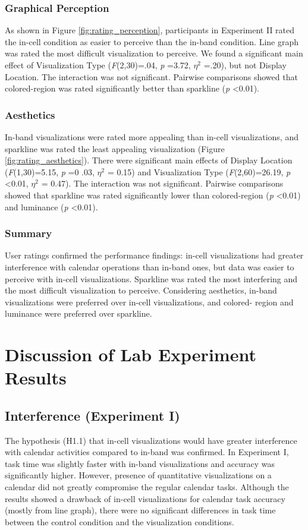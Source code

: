\documentclass[12pt,oneside]{book}
\begin{document}
\subsubsection{Graphical Perception}
As shown in Figure \ref{fig:rating_perception}, participants in Experiment II rated the in-cell condition as easier to perceive than the in-band condition. Line graph was rated the most difficult visualization to perceive. We found a significant main effect of Visualization Type (\textit{F}(2,30)=.04,  \textit{p} =3.72,  $\eta^2$ =.20), but not Display Location. The interaction was not significant. Pairwise comparisons showed that colored-region was rated significantly better than sparkline (\textit{p} \textless 0.01).

\subsubsection{Aesthetics}
In-band visualizations were rated more appealing than in-cell visualizations, and sparkline was rated the least appealing visualization (Figure \ref{fig:rating_aesthetics}). There were significant main effects of Display Location (\textit{F}(1,30)=5.15, \textit{p} =0 .03, $\eta^2$ = 0.15) and Visualization Type (\textit{F}(2,60)=26.19, \textit{p} \textless 0.01, $\eta^2$ = 0.47). The interaction was not significant. Pairwise comparisons showed that sparkline was rated significantly lower than colored-region (\textit{p} \textless 0.01) and luminance (\textit{p} \textless 0.01).

\subsubsection{Summary}
User ratings confirmed the performance findings: in-cell visualizations had greater interference with calendar operations than in-band ones, but data was easier to perceive with in-cell visualizations. Sparkline was rated the most interfering and the most difficult visualization to perceive. Considering aesthetics, in-band visualizations were preferred over in-cell visualizations, and colored- region and luminance were preferred over sparkline.


\section{Discussion of Lab Experiment Results}
\subsection{Interference (Experiment I)}
The hypothesis (H1.1) that in-cell visualizations would have greater interference with calendar activities compared to in-band was confirmed. In Experiment I, task time was slightly faster with in-band visualizations and accuracy was significantly higher. However, presence of quantitative visualizations on a calendar did not greatly compromise the regular calendar tasks. Although the results showed a drawback of in-cell visualizations for calendar task accuracy (mostly from line graph), there were no significant differences in task time between the control condition and the visualization conditions. 
\end{document}
